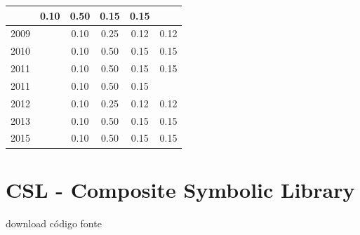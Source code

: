 \begin{table}[H]
\begin{tabular}{| l | c | c | c | c | c |}
          &
          0.10
          &
          0.50
          &
          0.15
          &
            {\color{red} 0.15}
          \\
\hline
            2009
          &
          
          &
          0.10
          &
          0.25
          &
          0.12
          &
            {\color{red} 0.12}
          \\
\hline
            2010
          &
          
          &
          0.10
          &
          0.50
          &
          0.15
          &
            {\color{red} 0.15}
          \\
\hline
            2011
          &
          
          &
          0.10
          &
          0.50
          &
          0.15
          &
            {\color{red} 0.15}
          \\
            2011
          &
          
          &
          0.10
          &
          0.50
          &
          0.15
          &
          \\
\hline
            2012
          &
          
          &
          0.10
          &
          0.25
          &
          0.12
          &
            {\color{red} 0.12}
          \\
\hline
            2013
          &
          
          &
          0.10
          &
          0.50
          &
          0.15
          &
            {\color{red} 0.15}
          \\
\hline
            2015
          &
          
          &
          0.10
          &
          0.50
          &
          0.15
          &
            {\color{red} 0.15}
          \\
\hline
\end{tabular}
\end{table}



\section{CSL - Composite Symbolic Library}
\checkmark download
\checkmark código fonte



